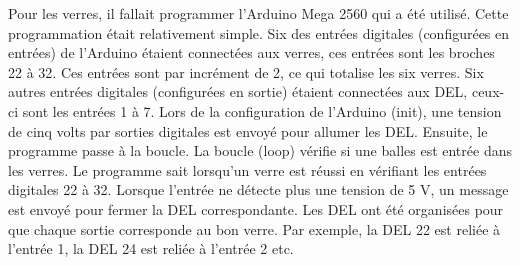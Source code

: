 

Pour les verres, il fallait programmer l'Arduino Mega 2560 qui a été utilisé.
Cette programmation était relativement simple.
Six des entrées digitales (configurées en entrées) de l'Arduino étaient connectées aux verres, ces entrées sont les broches 22 à 32.
Ces entrées sont par incrément de 2, ce qui totalise les six verres.
Six autres entrées digitales (configurées en sortie) étaient connectées aux DEL, ceux-ci sont les entrées 1 à 7.
Lors de la configuration de l'Arduino (init), une tension de cinq volts par sorties digitales est envoyé pour allumer les DEL.
Ensuite, le programme passe à la boucle.
La boucle (loop) vérifie si une balles est entrée dans les verres.
Le programme sait lorsqu'un verre est réussi en vérifiant les entrées digitales 22 à 32.
Lorsque l'entrée ne détecte plus une tension de 5 V, un message est envoyé pour fermer la DEL correspondante.
Les DEL ont été organisées pour que chaque sortie corresponde au bon verre.
Par exemple, la DEL 22 est reliée à l’entrée 1, la DEL 24 est reliée à l’entrée 2 etc.
